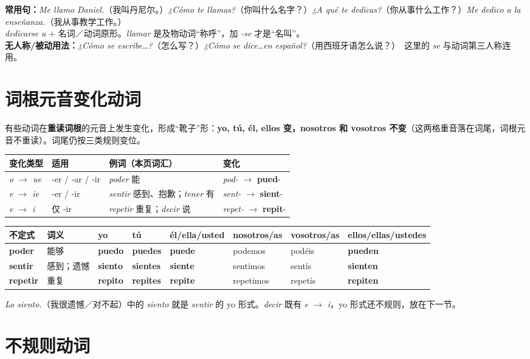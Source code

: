 \documentclass[a4paper,11pt]{ctexart}
\makeatletter
\newcommand{\ir}[1]{\textbf{\textcolor{accent}{#1}}}
\newcommand{\es}[1]{\textit{#1}}
\newcommand{\conj}[8]{\textbf{#1} & {\small #2} & #3 & #4 & #5 & #6 & #7 & #8 \\}
\newenvironment{conjtable}{%
  \par\small\setlength{\tabcolsep}{3.5pt}
  \begin{tabular}{@{}>{\raggedright\arraybackslash}p{1.95cm}>{\raggedright\arraybackslash}p{1.6cm}%
    >{\raggedright\arraybackslash}p{1.75cm}>{\raggedright\arraybackslash}p{1.75cm}>{\raggedright\arraybackslash}p{1.95cm}%
    >{\raggedright\arraybackslash}p{2.15cm}>{\raggedright\arraybackslash}p{1.95cm}>{\raggedright\arraybackslash}p{2.1cm}@{}}
  \toprule
  \textbf{不定式} & \textbf{词义} & \textbf{yo} & \textbf{tú} & \textbf{él/ella/\newline usted} & \textbf{nosotros/as} & \textbf{vosotros/as} & \textbf{ellos/ellas/\newline ustedes} \\
  \midrule
}{%
  \bottomrule\end{tabular}\par\normalsize
}
\makeatother
\begin{document}
\begin{tip}
\textbf{常用句：}\es{Me llamo Daniel.}（我叫丹尼尔。）\quad\es{¿Cómo te llamas?}（你叫什么名字？）\quad\es{¿A qué te dedicas?}（你从事什么工作？）\quad\es{Me dedico a la enseñanza.}（我从事教学工作。）\\
\es{dedicarse a} + 名词／动词原形。\es{llamar} 是及物动词“称呼”，加 \es{-se} 才是“名叫”。\\
\textbf{无人称/被动用法：}\es{¿Cómo se escribe\ldots?}（怎么写？）\quad\es{¿Cómo se dice\ldots en español?}（用西班牙语怎么说？）\ 这里的 \es{se} 与动词第三人称连用。
\end{tip}

\section{词根元音变化动词}

有些动词在\textbf{重读词根}的元音上发生变化，形成“靴子”形：\textbf{yo, tú, él, ellos 变，nosotros 和 vosotros 不变}（这两格重音落在词尾，词根元音不重读）。词尾仍按三类规则变位。

\begin{center}
\small
\begin{tabular}{@{}llll@{}}
\toprule
变化类型 & 适用 & 例词（本页词汇） & 变化 \\
\midrule
\es{o $\to$ ue} & -er / -ar / -ir & \es{poder} 能 & \es{pod-} $\to$ \ir{pued}- \\
\es{e $\to$ ie} & -er / -ir & \es{sentir} 感到、抱歉；\es{tener} 有 & \es{sent-} $\to$ \ir{sient}- \\
\es{e $\to$ i}  & 仅 -ir & \es{repetir} 重复；\es{decir} 说 & \es{repet-} $\to$ \ir{repit}- \\
\bottomrule
\end{tabular}
\end{center}

\begin{conjtable}
\conj{poder}{能够}{\ir{puedo}}{\ir{puedes}}{\ir{puede}}{podemos}{podéis}{\ir{pueden}}
\conj{sentir}{感到；遗憾}{\ir{siento}}{\ir{sientes}}{\ir{siente}}{sentimos}{sentís}{\ir{sienten}}
\conj{repetir}{重复}{\ir{repito}}{\ir{repites}}{\ir{repite}}{repetimos}{repetís}{\ir{repiten}}
\end{conjtable}

\es{Lo siento.}（我很遗憾／对不起）中的 \es{siento} 就是 \es{sentir} 的 yo 形式。\es{decir} 既有 \es{e $\to$ i}，yo 形式还不规则，放在下一节。

\section{不规则动词}
\end{document}
